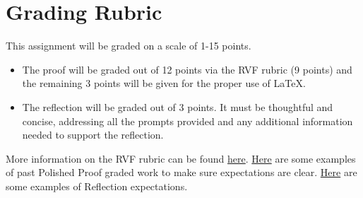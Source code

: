 \documentclass{article}
\theoremstyle{definition}
\begin{document}
\section*{Grading Rubric}
    This assignment will be graded on a scale of 1-15 points.
    \begin{itemize}
    \item The proof will be graded out of 12 points via the RVF rubric (9 points) and the remaining 3 points will be given for the proper use of \LaTeX.
    \item The reflection will be graded out of 3 points. It must be thoughtful and concise, addressing all the prompts provided and any additional information needed to support the reflection.
    \end{itemize}
     
    More information on the RVF rubric can be found 
    \href{https://drive.google.com/file/d/1P0OBjw-GkX64uCpYcqYmXARapf9MwaiI/view?usp=sharing}{here}. 
    \href{https://drive.google.com/file/d/14zLx8TDPdD8shbwgMGPAAWdQrUZDz1jd/view?usp=share_link}{Here} 
    are some examples of past Polished Proof graded work to make sure expectations are clear. \href{https://docs.google.com/document/d/1GcCZI_ueOWXlBC9xIBietOw1uEzFIyg-TzuHvbCZumU/edit?usp=sharing}{Here} are some examples of Reflection expectations.


	
\end{document}
